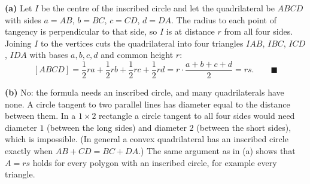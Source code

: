 \textbf{(a)} Let $I$ be the centre of the inscribed circle and let the quadrilateral be $ABCD$ with sides $a=AB$, $b=BC$, $c=CD$, $d=DA$. The radius to each point of tangency is perpendicular to that side, so $I$ is at distance $r$ from all four sides. Joining $I$ to the vertices cuts the quadrilateral into four triangles $IAB$, $IBC$, $ICD$, $IDA$ with bases $a,b,c,d$ and common height $r$:
\[
[ABCD]=\dfrac{1}{2}ra+\dfrac{1}{2}rb+\dfrac{1}{2}rc+\dfrac{1}{2}rd=r\cdot\dfrac{a+b+c+d}{2}=rs. \qquad\blacksquare
\]


\textbf{(b)} No: the formula needs an inscribed circle, and many quadrilaterals have none. A circle tangent to two parallel lines has diameter equal to the distance between them. In a $1\times2$ rectangle a circle tangent to all four sides would need diameter $1$ (between the long sides) and diameter $2$ (between the short sides), which is impossible. (In general a convex quadrilateral has an inscribed circle exactly when $AB+CD=BC+DA$.) The same argument as in (a) shows that $A=rs$ holds for every polygon with an inscribed circle, for example every triangle.
